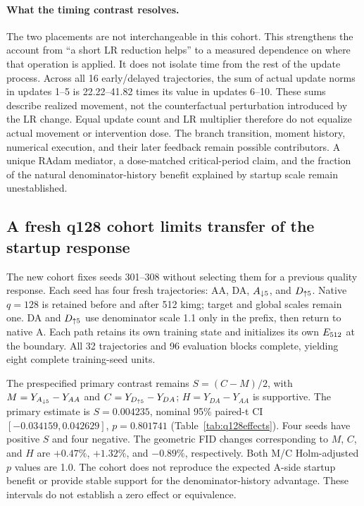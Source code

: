 \paragraph{What the timing contrast resolves.}
The two placements are not interchangeable in this cohort. This strengthens the account from ``a short LR reduction helps'' to a measured dependence on where that operation is applied. It does not isolate time from the rest of the update process. Across all 16 early/delayed trajectories, the sum of actual update norms in updates 1--5 is 22.22--41.82 times its value in updates 6--10. These sums describe realized movement, not the counterfactual perturbation introduced by the LR change. Equal update count and LR multiplier therefore do not equalize actual movement or intervention dose. The branch transition, moment history, numerical execution, and their later feedback remain possible contributors. A unique RAdam mediator, a dose-matched critical-period claim, and the fraction of the natural denominator-history benefit explained by startup scale remain unestablished.

\subsection{A fresh q128 cohort limits transfer of the startup response}
\label{sec:q128}
The new cohort fixes seeds 301--308 without selecting them for a previous quality response. Each seed has four fresh trajectories: AA, DA, $A_{\downarrow 5}$, and $D_{\uparrow 5}$. Native $q=128$ is retained before and after 512 kimg; target and global scales remain one. DA and $D_{\uparrow 5}$ use denominator scale 1.1 only in the prefix, then return to native A. Each path retains its own training state and initializes its own $E_{512}$ at the boundary. All 32 trajectories and 96 evaluation blocks complete, yielding eight complete training-seed units.

The prespecified primary contrast remains $S=(C-M)/2$, with $M=Y_{A_{\downarrow 5}}-Y_{AA}$ and $C=Y_{D_{\uparrow 5}}-Y_{DA}$; $H=Y_{DA}-Y_{AA}$ is supportive. The primary estimate is $S=0.004235$, nominal 95\% paired-t CI $[-0.034159,0.042629]$, $p=0.801741$ (Table~\ref{tab:q128effects}). Four seeds have positive $S$ and four negative. The geometric FID changes corresponding to $M$, $C$, and $H$ are $+0.47\%$, $+1.32\%$, and $-0.89\%$, respectively. Both M/C Holm-adjusted $p$ values are 1.0. The cohort does not reproduce the expected A-side startup benefit or provide stable support for the denominator-history advantage. These intervals do not establish a zero effect or equivalence.

